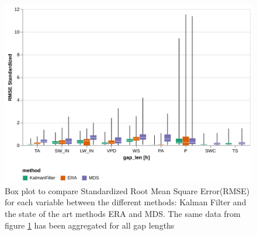 \documentclass{article}
\newcommand{\imgwidth}{6in}
\begin{document}
\begin{figure}
    \centerline{\includegraphics[width=\imgwidth]{the_plot_stand}}
\caption{Box plot to compare Standardized Root Mean Square Error(RMSE) for each variable between the different methods: Kalman Filter and the state of the art methods ERA and MDS. The same data from figure \ref{fig:the_plot} has been aggregated for all gap lengths}
\label{fig:the_plot}
\end{figure}





\end{document}

